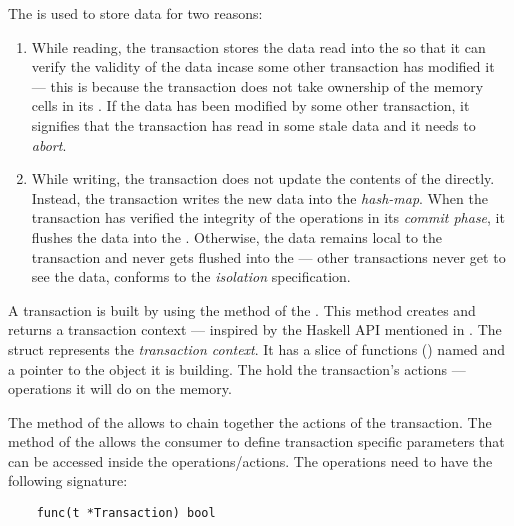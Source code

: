 \documentclass[../main]{subfiles}
\begin{document}
  The  is used to store data for two reasons: \par

  \begin{enumerate}

    \item While reading, the transaction stores the data read into the  so that it can verify the validity of the data incase some other transaction has modified it --- this is because the transaction does not take ownership of the memory cells in its . If the data has been modified by some other transaction, it signifies that the transaction has read in some stale data and it needs to {\em abort}.

    \item While writing, the transaction does not update the contents of the  directly. Instead, the transaction writes the new data into the  {\em hash-map}. When the transaction has verified the integrity of the operations in its {\em commit phase}, it flushes the data into the . Otherwise, the data remains local to the transaction and never gets flushed into the  --- other transactions never get to see the data, conforms to the {\em isolation} specification.

  \end{enumerate}

  \par
  A transaction is built by using the  method of the . This method creates and returns a transaction context --- inspired by the Haskell API mentioned in \cite{jones2007beautiful}. The  struct represents the {\em transaction context}. It has a slice of functions () named  and a pointer to the  object it is building. The  hold the transaction's actions --- operations it will do on the memory. \par

  The  method of the  allows to chain together the actions of the transaction. The  method of the  allows the consumer to define transaction specific parameters that can be accessed inside the operations/actions. The operations need to have the following signature:
  
  \begin{lstlisting}
    func(t *Transaction) bool
  \end{lstlisting}
\end{document}
